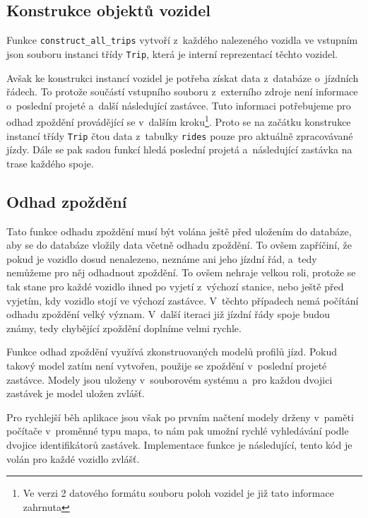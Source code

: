 \subsection{Konstrukce objektů vozidel}


Funkce \verb-construct_all_trips- vytvoří z~každého nalezeného vozidla ve vstupním \gls{json} souboru instanci třídy \verb-Trip-, která je interní reprezentací těchto vozidel.


\bigbreak


Avšak ke konstrukci instancí vozidel je potřeba získat data z~databáze o~jízdních řádech. To protože součástí vstupního souboru z~externího zdroje není informace o~poslední projeté a~další následující zastávce. Tuto informaci potřebujeme pro odhad zpoždění provádějící se v~dalším kroku\footnote{Ve verzi 2 datového formátu souboru poloh vozidel je již tato informace zahrnuta}. Proto se na začátku konstrukce instancí třídy \verb-Trip- čtou data z~tabulky \verb-rides- pouze pro aktuálně zpracovávané jízdy. Dále se pak sadou funkcí hledá poslední projetá a~následující zastávka na trase každého spoje.


\subsection{Odhad zpoždění}


Tato funkce odhadu zpoždění musí být volána ještě před uložením do databáze, aby se do databáze vložily data včetně odhadu zpoždění. To ovšem zapříčiní, že pokud je vozidlo dosud nenalezeno, neznáme ani jeho jízdní řád, a~tedy nemůžeme pro něj odhadnout zpoždění. To ovšem nehraje velkou roli, protože se tak stane pro každé vozidlo ihned po vyjetí z~výchozí stanice, nebo ještě před vyjetím, kdy vozidlo stojí ve výchozí zastávce. V~těchto případech nemá počítání odhadu zpoždění velký význam. V~další iteraci již jízdní řády spoje budou známy, tedy chybějící zpoždění doplníme velmi rychle.


\bigbreak


Funkce odhad zpoždění využívá zkonstruovaných modelů profilů jízd. Pokud takový model zatím není vytvořen, použije se zpoždění v~poslední projeté zastávce. Modely jsou uloženy v~souborovém systému a~pro každou dvojici zastávek je model uložen zvlášť.


\bigbreak


Pro rychlejší běh aplikace jsou však po prvním načtení modely drženy v~paměti počítače v~proměnné typu mapa, to nám pak umožní rychlé vyhledávání podle dvojice identifikátorů zastávek. Implementace funkce je následující, tento kód je volán pro každé vozidlo zvlášť.


